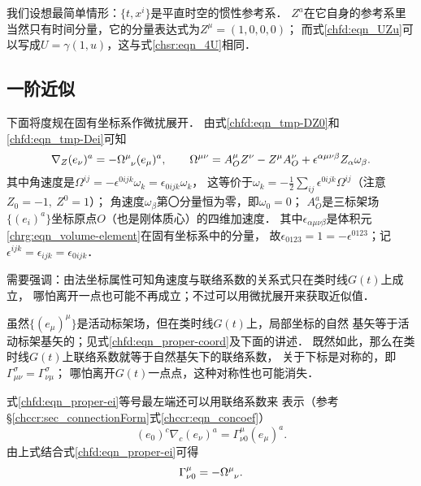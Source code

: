 我们设想最简单情形：$\{t,x^i\}$是平直时空的惯性参考系．
$Z^a$在它自身的参考系里当然只有时间分量，它的分量表达式为$Z^\mu=(1,0,0,0)$；
而式\eqref{chfd:eqn_UZu}可以写成$U=\gamma(1,u)$，这与式\eqref{chsr:eqn_4U}相同．


\subsection{一阶近似}
下面将度规在固有坐标系作微扰展开．
由式\eqref{chfd:eqn_tmp-DZ0}和\eqref{chfd:eqn_tmp-Dei}可知
\begin{equation}\label{chfd:eqn_proper-ei}
    \nabla_Z (e_\nu)^a = - \Omega^{\mu}_{\hphantom{\mu} \nu} (e_\mu)^a, \qquad
       \Omega^{\mu\nu}= A^\mu_O Z^\nu - Z^\mu A^\nu_O +
       \epsilon^{\alpha\mu\nu\beta} Z_\alpha \omega_\beta.
\end{equation}
其中角速度是$\Omega^{ij} = -\epsilon^{0ijk}\omega_k = \epsilon_{0ijk}\omega_k$，
这等价于$\omega_k = -\frac{1}{2} \sum_{ij}\epsilon^{0ijk} \Omega^{ij}$（注意$Z_0=-1, \ Z^0=1$）；
角速度$\omega_\beta$第〇分量恒为零，即$\omega_0=0$；
$A_O^a$是三标架场$\{(e_i)^a\}$坐标原点$O$（也是刚体质心）的四维加速度．
其中$\epsilon_{\alpha\mu\nu\beta}$是体积元\eqref{chrg:eqn_volume-element}在固有坐标系中的分量，
故$\epsilon_{0123}=1=-\epsilon^{0123}$；记$\epsilon^{ijk}=\epsilon_{ijk}=\epsilon_{0ijk}$．

需要强调：由法坐标属性可知角速度与联络系数的关系式只在类时线$G(t)$上成立，
哪怕离开一点也可能不再成立；不过可以用微扰展开来获取近似值．

虽然$\{(e_\mu)^\mu\}$是活动标架场，但在类时线$G(t)$上，局部坐标的自然
基矢等于活动标架基矢的；见式\eqref{chfd:eqn_proper-coord}及下面的讲述．
既然如此，那么在类时线$G(t)$上联络系数就等于自然基矢下的联络系数，
关于下标是对称的，即$\Gamma^\sigma_{\mu\nu}=\Gamma^\sigma_{\nu\mu}$；
哪怕离开$G(t)$一点点，这种对称性也可能消失．


式\eqref{chfd:eqn_proper-ei}等号最左端还可以用联络系数来
表示（参考\S\ref{chccr:sec_connectionForm}式\eqref{chccr:eqn_concoef}）
\begin{equation}
    (e_0)^c\nabla_c (e_\nu)^a = \Gamma^{\mu}_{\nu 0} (e_\mu)^a  .
\end{equation}
由上式结合式\eqref{chfd:eqn_proper-ei}可得
\begin{equation}
    \Gamma^{\mu}_{\nu 0} = -\Omega^{\mu}_{\hphantom{\mu} \nu}.
\end{equation}

